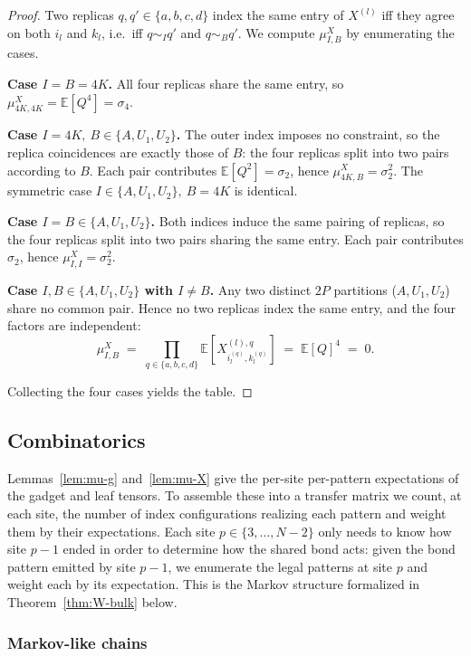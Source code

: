 \documentclass[12pt,a4paper]{article}
\begin{document}
\begin{proof}
Two replicas $q,q'\in\{a,b,c,d\}$ index the same entry of $X^{(l)}$ iff 
they agree on both $i_l$ and $k_l$, i.e.\ iff $q\sim_I q'$ and $q\sim_B q'$.
We compute $\mu^X_{I,B}$ by enumerating the cases.

\smallskip\noindent\textbf{Case $I=B=4K$.} All four replicas share the same 
entry, so $\mu^X_{4K,4K} = \mathbb{E}[Q^4] = \sigma_4$.

\smallskip\noindent\textbf{Case $I=4K,\ B\in\{A,U_1,U_2\}$.} The outer index 
imposes no constraint, so the replica coincidences are exactly those of $B$: 
the four replicas split into two pairs according to $B$. Each pair 
contributes $\mathbb{E}[Q^2]=\sigma_2$, hence $\mu^X_{4K,B}=\sigma_2^2$. The 
symmetric case $I\in\{A,U_1,U_2\},\ B=4K$ is identical.

\smallskip\noindent\textbf{Case $I=B\in\{A,U_1,U_2\}$.} Both indices induce 
the same pairing of replicas, so the four replicas split into two pairs 
sharing the same entry. Each pair contributes $\sigma_2$, hence 
$\mu^X_{I,I}=\sigma_2^2$.

\smallskip\noindent\textbf{Case $I,B\in\{A,U_1,U_2\}$ with $I\ne B$.} 
Any two distinct $2P$ partitions ($A,U_1,U_2$) share no common pair. Hence no two replicas index the same entry, and the four factors are independent:
\[
\mu^X_{I,B} \;=\; \prod_{q\in\{a,b,c,d\}} \mathbb{E}\!\left[X^{(l),q}_{i^{(q)}_l,k^{(q)}_l}\right]
\;=\; \mathbb{E}[Q]^4 \;=\; 0.
\]

\smallskip
Collecting the four cases yields the table.
\end{proof}

\subsection{Combinatorics}\label{sec:combinatorics}

Lemmas~\ref{lem:mu-g} and~\ref{lem:mu-X} give the per-site per-pattern 
expectations of the gadget and leaf tensors. To assemble these into a 
transfer matrix we count, at each site, the number of index 
configurations realizing each pattern and weight them by their 
expectations. Each site $p\in\{3,\dots,N-2\}$ only needs to know how 
site $p-1$ ended in order to determine how the shared bond acts: given 
the bond pattern emitted by site $p-1$, we enumerate the legal patterns 
at site $p$ and weight each by its expectation. This is the Markov 
structure formalized in Theorem~\ref{thm:W-bulk} below.
\subsubsection{Markov-like chains}\label{sec:markov}
\end{document}
